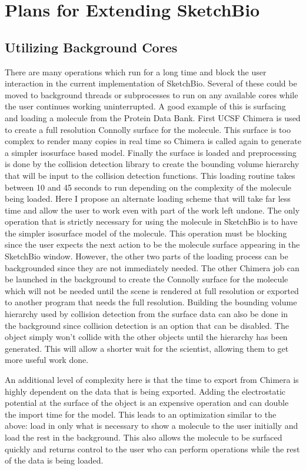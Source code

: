 \documentclass{article} %
\begin{document}
\section{Plans for Extending SketchBio}
\subsection{Utilizing Background Cores}
There are many operations which run for a long time and block the user interaction in the current implementation of SketchBio.  Several of these could be moved to background threads or subprocesses to run on any available cores while the user continues working uninterrupted.  A good example of this is surfacing and loading a molecule from the Protein Data Bank.  First UCSF Chimera is used to create a full resolution Connolly surface for the molecule.  This surface is too complex to render many copies in real time so Chimera is called again to generate a simpler isosurface based model.  Finally the surface is loaded and preprocessing is done by the collision detection library to create the bounding volume hierarchy that will be input to the collision detection functions.  This loading routine takes between 10 and 45 seconds to run depending on the complexity of the molecule being loaded.  Here I propose an alternate loading scheme that will take far less time and allow the user to work even with part of the work left undone.  The only operation that is strictly necessary for using the molecule in SketchBio is to have the simpler isosurface model of the molecule.  This operation must be blocking since the user expects the next action to be the molecule surface appearing in the SketchBio window.  However, the other two parts of the loading process can be backgrounded since they are not immediately needed.  The other Chimera job can be launched in the background to create the Connolly surface for the molecule which will not be needed until the scene is rendered at full resolution or exported to another program that needs the full resolution.  Building the bounding volume hierarchy used by collision detection from the surface data can also be done in the background since collision detection is an option that can be disabled.  The object simply won't collide with the other objects until the hierarchy has been generated.  This will allow a shorter wait for the scientist, allowing them to get more useful work done.

An additional level of complexity here is that the time to export from Chimera is highly dependent on the data that is being exported.  Adding the electrostatic potential at the surface of the object is an expensive operation and can double the import time for the model.  This leads to an optimization similar to the above: load in only what is necessary to show a molecule to the user initially and load the rest in the background.  This also allows the molecule to be surfaced quickly and returns control to the user who can perform operations while the rest of the data is being loaded.
\end{document}
